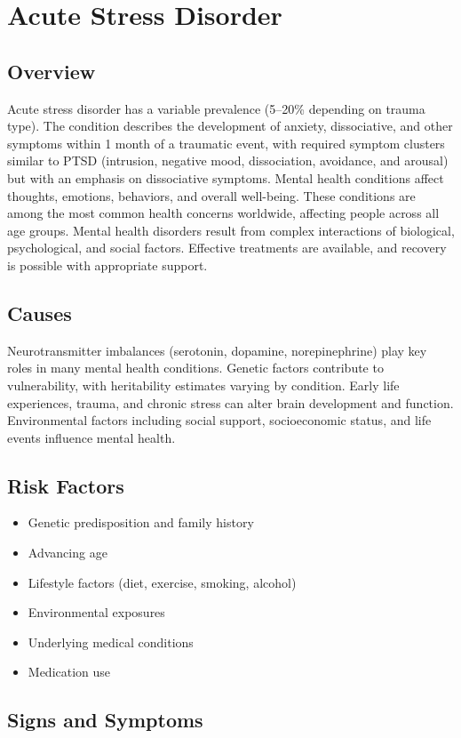 \chapter{Acute Stress Disorder}
\label{sec:Acute Stress Disorder}

\section{Overview}
Acute stress disorder has a variable prevalence (5--20\% depending on trauma type). The condition describes the development of anxiety, dissociative, and other symptoms within 1 month of a traumatic event, with required symptom clusters similar to PTSD (intrusion, negative mood, dissociation, avoidance, and arousal) but with an emphasis on dissociative symptoms. Mental health conditions affect thoughts, emotions, behaviors, and overall well-being. These conditions are among the most common health concerns worldwide, affecting people across all age groups. Mental health disorders result from complex interactions of biological, psychological, and social factors. Effective treatments are available, and recovery is possible with appropriate support.
\section{Causes}
Neurotransmitter imbalances (serotonin, dopamine, norepinephrine) play key roles in many mental health conditions. Genetic factors contribute to vulnerability, with heritability estimates varying by condition. Early life experiences, trauma, and chronic stress can alter brain development and function. Environmental factors including social support, socioeconomic status, and life events influence mental health.   
\section{Risk Factors}
\begin{itemize}[noitemsep]
  \item Genetic predisposition and family history
  \item Advancing age
  \item Lifestyle factors (diet, exercise, smoking, alcohol)
  \item Environmental exposures
  \item Underlying medical conditions
  \item Medication use
\end{itemize}
\section{Signs and Symptoms}
